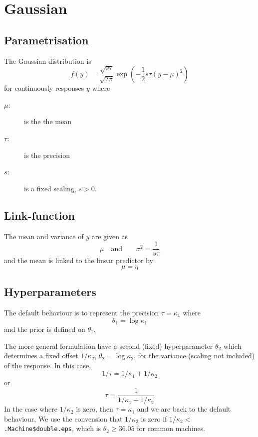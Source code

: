 \documentclass[a4paper,11pt]{article}
\begin{document}
\section*{Gaussian}

\subsection*{Parametrisation}

The Gaussian distribution is
\begin{displaymath}
    f(y) = \frac{\sqrt{s\tau}}{\sqrt{2\pi}} \exp\left( -\frac{1}{2}
      s\tau \left(y-\mu\right)^{2}\right)
\end{displaymath}
for continuously responses $y$ where
\begin{description}
\item[$\mu$:] is the the mean
\item[$\tau$:] is the precision
\item[$s$:] is a fixed scaling, $s>0$.    
\end{description}

\subsection*{Link-function}

The mean and variance of $y$ are given as
\begin{displaymath}
    \mu \quad\text{and}\qquad \sigma^{2} = \frac{1}{s\tau}
\end{displaymath}
and the mean is linked to the linear predictor by
\begin{displaymath}
    \mu = \eta
\end{displaymath}

\subsection*{Hyperparameters}

The default behaviour is to represent the precision $\tau = \kappa_1$
where
\begin{displaymath}
    \theta_1 = \log \kappa_1
\end{displaymath}
and the prior is defined on $\theta_1$.

The more general formulation have a second (fixed) hyperparameter
$\theta_2$ which determines a fixed offset $1/\kappa_2$,
$\theta_2=\log\kappa_2$, for the variance (scaling not included) of
the response. In this case,
\begin{displaymath}
    1/\tau = 1/\kappa_1 + 1/\kappa_2
\end{displaymath}
or
\begin{displaymath}
    \tau = \frac{1}{1/\kappa_1 + 1/\kappa_2}
\end{displaymath}
In the case where $1/\kappa_2$ is zero, then $\tau = \kappa_1$ and we
are back to the default behaviour. We use the convension that
$1/\kappa_2$ is zero if $1/\kappa_2 <$\verb|.Machine$double.eps|,%
which is $\theta_2 \ge 36.05$ for common machines.
\end{document}
